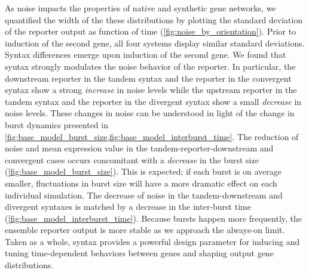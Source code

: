\documentclass[11pt]{article}
\begin{document}
As noise impacts the properties of native and synthetic gene networks, we quantified the width of the these distributions by plotting the standard deviation of the reporter output as function of time (\cref{fig:noise_by_orientation}). Prior to induction of the second gene, all four systems display similar standard deviations. Syntax differences emerge upon induction of the second gene. We found that syntax strongly modulates the noise behavior of the reporter. In particular, the downstream reporter in the tandem syntax and the reporter in the convergent syntax show a strong \emph{increase} in noise levels while the upstream reporter in the tandem syntax and the reporter in the divergent syntax show a small \emph{decrease} in noise levels. These changes in noise can be understood in light of the change in burst dynamics presented in \cref{fig:base_model_burst_size,fig:base_model_interburst_time}.
The reduction of noise and mean expression value in the tandem-reporter-downstream and convergent cases occurs concomitant with a \emph{decrease} in the burst size (\cref{fig:base_model_burst_size}). This is expected; if each burst is on average smaller, fluctuations in burst size will have a more dramatic effect on each individual simulation. The decrease of noise in the tandem-downstream and divergent syntaxes is matched by a decrease in the inter-burst time (\cref{fig:base_model_interburst_time}). Because bursts happen more frequently, the ensemble reporter output is more stable as we approach the always-on limit.
Taken as a whole, syntax provides a powerful design parameter for inducing and tuning time-dependent behaviors between genes and shaping output gene distributions.
\end{document}
